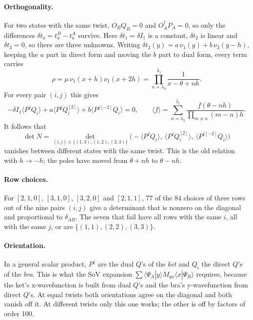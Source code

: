 \documentclass[11pt]{article}
\begin{document}
\paragraph{Orthogonality.} For two states with the same twist, $O_BQ_B=0$ and $O^\dagger_AP_A=0$, so only the differences $\delta t_a=t^B_a-t^A_a$ survive. Here $\delta t_1=\delta I_1$ is a constant, $\delta t_2$ is linear and $\delta t_3=0$, so there are three unknowns. Writing $\delta t_2(y)=a\,\nu_1(y)+b\,\nu_3(y-h)$, keeping the $a$ part in direct form and moving the $b$ part to dual form, every term carries
\[
\rho=\mu\,\nu_1(x+h)\nu_1(x+2h)=\prod_{n=\lambda_3}^{\lambda_1}\frac1{x-\theta+nh}.
\]
For every pair $(i,j)$ this gives
\begin{equation}
-\delta I_1\langle P^jQ_i\rangle+a\langle P^jQ_i^{[2]}\rangle+b\langle P^{j[-2]}Q_i\rangle=0,\qquad
\langle f\rangle=\sum_{n=\lambda_3}^{\lambda_1}\frac{f(\theta-nh)}{\prod_{m\ne n}(m-n)h}.
\end{equation}
It follows that
\begin{equation}
\det N=\det_{(i,j)\in\{(1,3),(1,2),(2,3)\}}\Big(-\langle P^jQ_i\rangle,\ \langle P^jQ_i^{[2]}\rangle,\ \langle P^{j[-2]}Q_i\rangle\Big)
\end{equation}
vanishes between different states with the same twist. This is the old relation with $h\to-h$; the poles have moved from $\theta+nh$ to $\theta-nh$.

\paragraph{Row choices.} For $[2,1,0]$, $[3,1,0]$, $[3,2,0]$ and $[2,1,1]$, 77 of the 84 choices of three rows out of the nine pairs $(i,j)$ give a determinant that is nonzero on the diagonal and proportional to $\delta_{AB}$. The seven that fail have all rows with the same $i$, all with the same $j$, or are $\{(1,1),(2,2),(3,3)\}$.

\paragraph{Orientation.} In a general scalar product, $P^j$ are the dual $Q$'s of the \emph{ket} and $Q_i$ the direct $Q$'s of the \emph{bra}. This is what the SoV expansion $\sum\langle\Psi_A|y\rangle M_{yx}\langle x|\Psi_B\rangle$ requires, because the ket's x-wavefunction is built from dual $Q$'s and the bra's y-wavefunction from direct $Q$'s. At equal twists both orientations agree on the diagonal and both vanish off it. At different twists only this one works; the other is off by factors of order 100.
\end{document}
